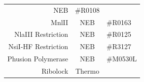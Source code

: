 \documentclass[11pt,singlespacinge,twoside]{reedthesis} %
\begin{document}
\begin{longtable}[]{@{}rcl@{}}
\begin{minipage}[t]{0.50\columnwidth}
NEB\strut
\end{minipage} & \begin{minipage}[t]{0.16\columnwidth}\raggedright
\#R0108\strut
\end{minipage}\tabularnewline
\begin{minipage}[t]{0.25\columnwidth}\raggedleft
MnlII\strut
\end{minipage} & \begin{minipage}[t]{0.50\columnwidth}\centering
NEB\strut
\end{minipage} & \begin{minipage}[t]{0.16\columnwidth}\raggedright
\#R0163\strut
\end{minipage}\tabularnewline
\begin{minipage}[t]{0.25\columnwidth}\raggedleft
NlaIII Restriction\strut
\end{minipage} & \begin{minipage}[t]{0.50\columnwidth}\centering
NEB\strut
\end{minipage} & \begin{minipage}[t]{0.16\columnwidth}\raggedright
\#R0125\strut
\end{minipage}\tabularnewline
\begin{minipage}[t]{0.25\columnwidth}\raggedleft
NsiI-HF Restriction\strut
\end{minipage} & \begin{minipage}[t]{0.50\columnwidth}\centering
NEB\strut
\end{minipage} & \begin{minipage}[t]{0.16\columnwidth}\raggedright
\#R3127\strut
\end{minipage}\tabularnewline
\begin{minipage}[t]{0.25\columnwidth}\raggedleft
Phusion Polymerase\strut
\end{minipage} & \begin{minipage}[t]{0.50\columnwidth}\centering
NEB\strut
\end{minipage} & \begin{minipage}[t]{0.16\columnwidth}\raggedright
\#M0530L\strut
\end{minipage}\tabularnewline
\begin{minipage}[t]{0.25\columnwidth}\raggedleft
Ribolock\strut
\end{minipage} & \begin{minipage}[t]{0.50\columnwidth}\centering
Thermo\strut
\end{minipage} & \begin{minipage}[t]{0.16\columnwidth}\raggedright

\end{minipage}
\end{longtable}
\end{document}

